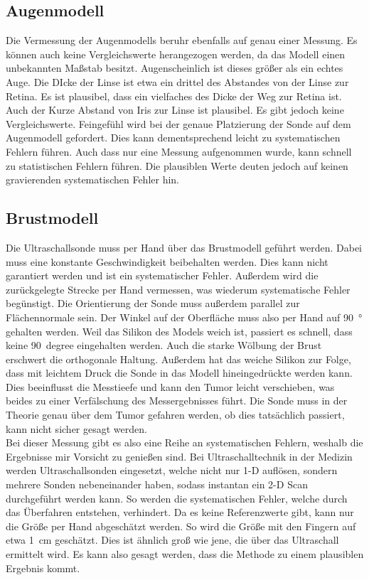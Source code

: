 \subsection{Augenmodell}
Die Vermessung der Augenmodells beruhr ebenfalls auf genau einer Messung. Es können auch keine Vergleichswerte 
herangezogen werden, da das Modell einen unbekannten Maßstab besitzt. Augenscheinlich ist dieses größer als 
ein echtes Auge. Die DIcke der Linse ist etwa ein drittel des Abstandes von der Linse zur Retina. Es ist 
plausibel, dass ein vielfaches des Dicke der Weg zur Retina ist. Auch der Kurze Abstand von Iris zur Linse ist 
plausibel. Es gibt jedoch keine Vergleichswerte. Feingefühl wird bei der genaue Platzierung der Sonde auf 
dem Augenmodell gefordert. Dies kann dementsprechend leicht zu systematischen Fehlern führen. Auch dass nur 
eine Messung aufgenommen wurde, kann schnell zu statistischen Fehlern führen. Die plausiblen Werte deuten jedoch 
auf keinen gravierenden systematischen Fehler hin.


\subsection{Brustmodell}
Die Ultraschallsonde muss per Hand über das Brustmodell geführt werden. Dabei muss eine konstante Geschwindigkeit 
beibehalten werden. Dies kann nicht garantiert werden und ist ein systematischer Fehler. Außerdem wird die 
zurückgelegte Strecke per Hand vermessen, was wiederum systematische Fehler begünstigt. Die Orientierung der Sonde 
muss außerdem parallel zur Flächennormale sein. Der Winkel auf der Oberfläche muss also per Hand auf \qty{90}{\degree} 
gehalten werden. Weil das Silikon des Models weich ist, passiert es schnell, dass keine \qty{90}{degree} eingehalten 
werden. Auch die starke Wölbung der Brust erschwert die orthogonale Haltung. Außerdem hat das weiche Silikon zur 
Folge, dass mit leichtem Druck die Sonde in das Modell hineingedrückte werden kann. Dies beeinflusst die Messtieefe 
und kann den Tumor leicht verschieben, was beides zu einer Verfälschung des Messergebnisses führt. Die Sonde muss 
in der Theorie genau über dem Tumor gefahren werden, ob dies tatsächlich passiert, kann nicht sicher gesagt werden. \\
\noindent Bei dieser Messung gibt es also eine Reihe an systematischen Fehlern, weshalb die Ergebnisse mir Vorsicht 
zu genießen sind. Bei Ultraschalltechnik in der Medizin werden Ultraschallsonden eingesetzt, welche nicht nur 1-D 
auflösen, sondern mehrere Sonden nebeneinander haben, sodass instantan ein 2-D Scan durchgeführt werden kann. So 
werden die systematischen Fehler, welche durch das Überfahren entstehen, verhindert. Da es keine Referenzwerte gibt, 
kann nur die Größe per Hand abgeschätzt werden. So wird die Größe mit den Fingern auf etwa \qty{1}{\centi\meter} geschätzt. 
Dies ist ähnlich groß wie jene, die über das Ultraschall ermittelt wird. Es kann also gesagt werden, dass die 
Methode zu einem plausiblen Ergebnis kommt.


